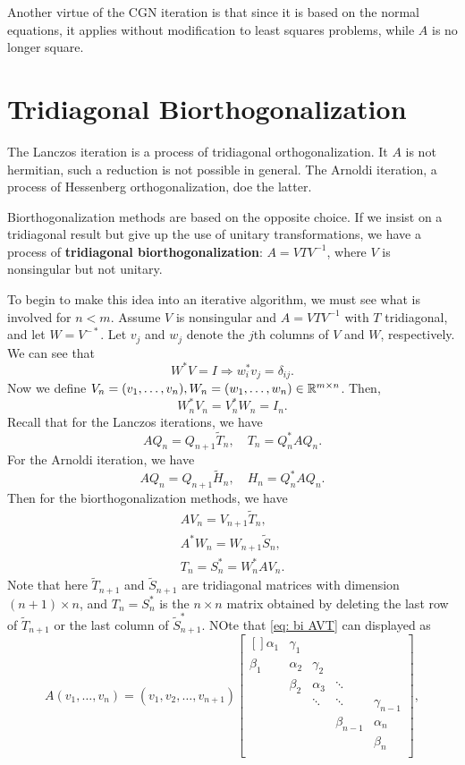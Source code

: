 Another virtue of the CGN iteration is that since it is based on the normal equations, it applies without modification to least squares problems, while $ A $ is no longer square.

\section{Tridiagonal Biorthogonalization}
The Lanczos iteration is a process of tridiagonal orthogonalization. It $ A $ is not hermitian, such a reduction is not possible in general. The Arnoldi iteration, a process of Hessenberg orthogonalization, doe the latter. 

Biorthogonalization methods are based on the opposite choice. If we insist on a tridiagonal result but give up the use of unitary transformations, we have a process of \textbf{tridiagonal biorthogonalization}: $ A = VTV^{-1}  $, where $ V $ is nonsingular but not unitary. 

To begin to make this idea into an iterative algorithm, we must see what is involved for $ n<m $. Assume $ V $ is nonsingular and $ A = VTV^{-1}  $ with $ T $ tridiagonal, and let $ W= V^{-*} $. Let $ v_j $ and $ w_j $ denote the $ j$th columns of $ V $ and $ W $, respectively. We can see that 
\[
    W^* V = I \Rightarrow w_i^* v_j  = \delta _{ij}.    
\]
Now we define $ V_n = (v_1,\ldots ,v_n) , W_n = (w_1,\ldots ,w_n) \in \mathbb{R}^{m\times n} $. Then, 
\[
    W_n^* V_n = V_n^* W_n = I_n. 
\]
Recall that for the Lanczos iterations, we have 
\[
    AQ_n = Q_{n+1}\tilde T_n, \quad T_n = Q_n^*  A Q_n. 
\]
For the Arnoldi iteration,  we have 
\[
    AQ_n = Q_{n+1}\tilde H_n, \quad H_n = Q_n^* A Q_n.
\]
Then for the biorthogonalization methods, we have 
\begin{align}
    AV_n = V_{n+1}\tilde T_n, \label{eq: bi AVT}\\ 
    A^* W_n = W_{n+1}\tilde S_n , \label{eq: bi AWS} \\ 
    T_n = S_n^*  = W_n^* A V_n. \label{eq: bi TSAW} 
\end{align}
Note that here $ \tilde T_{n+1} $ and $ \tilde S_{n+1}$ are tridiagonal matrices with dimension $ (n+1)\times n $, and $ T_n = S_n^*  $ is the $ n\times n $ matrix obtained by deleting the last row of $ \tilde T_{n+1} $ or the last column of $ \tilde S_{n+1}^*  $. NOte that \eqref{eq: bi AVT} can displayed as 
\[
A (v_1,\ldots ,v_n) = (v_1, v_2,\ldots ,v_{n+1})\begin{bmatrix}[] 
    \alpha _1 & \gamma _1 &  &  &   \\
    \beta _1 & \alpha _2 & \gamma _2 &  &   \\
     & \beta _2 & \alpha _3 & \ddots &   \\
     &  & \ddots & \ddots &  \gamma _{n-1} \\
     &  &  & \beta _{n-1} &  \alpha _n \\
     &  &  &  &  \beta _n \\
\end{bmatrix} ,
\]

